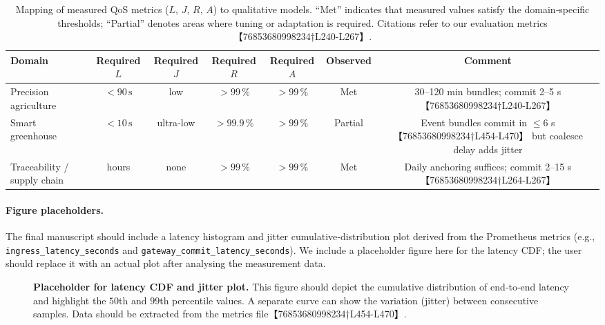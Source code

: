 \begin{table}[ht]
  \centering
  \caption{Mapping of measured QoS metrics (\(L\), \(J\), \(R\), \(A\)) to qualitative models.  ``Met'' indicates that measured values satisfy the domain‑specific thresholds; ``Partial'' denotes areas where tuning or adaptation is required.  Citations refer to our evaluation metrics【76853680998234†L240-L267】.}
  \label{tab:qos-map}
  \begin{tabular}{lcccccc}
    \toprule
    \textbf{Domain} & \textbf{Required \(L\)} & \textbf{Required \(J\)} & \textbf{Required \(R\)} & \textbf{Required \(A\)} & \textbf{Observed} & \textbf{Comment} \\
    \midrule
    Precision agriculture & $<90\,\text{s}$ & low & $>99\,\%$ & $>99\,\%$ & Met & 30–120 min bundles; commit 2–5 s【76853680998234†L240-L267】 \\
    Smart greenhouse & $<10\,\text{s}$ & ultra‑low & $>99.9\,\%$ & $>99\,\%$ & Partial & Event bundles commit in $\le6$ s【76853680998234†L454-L470】 but coalesce delay adds jitter \\
    Traceability / supply chain & hours & none & $>99\,\%$ & $>99\,\%$ & Met & Daily anchoring suffices; commit 2–15 s【76853680998234†L264-L267】 \\
    \bottomrule
  \end{tabular}
\end{table}

\paragraph{Figure placeholders.}  The final manuscript should include a latency histogram and jitter cumulative‑distribution plot derived from the Prometheus metrics (e.g., \texttt{ingress\_latency\_seconds} and \texttt{gateway\_commit\_latency\_seconds}).  We include a placeholder figure here for the latency CDF; the user should replace it with an actual plot after analysing the measurement data.
\begin{figure}[h]
  \centering
  \caption{\textbf{Placeholder for latency CDF and jitter plot.}  This figure should depict the cumulative distribution of end‑to‑end latency and highlight the \(50\)th and \(99\)th percentile values.  A separate curve can show the variation (jitter) between consecutive samples.  Data should be extracted from the metrics file【76853680998234†L454-L470】.}
  \label{fig:latency-cdf}
\end{figure}

